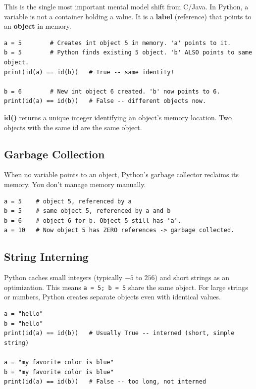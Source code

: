 \documentclass[12pt,a4paper]{article}
\newcommand{\code}[1]{\texttt{\small\color{pyblue}#1}}
\begin{document}
This is the single most important mental model shift from C/Java. In Python, a variable is not a container holding a value. It is a \textbf{label} (reference) that points to an \textbf{object} in memory.

\begin{lstlisting}
a = 5        # Creates int object 5 in memory. 'a' points to it.
b = 5        # Python finds existing 5 object. 'b' ALSO points to same object.
print(id(a) == id(b))   # True -- same identity!

b = 6        # New int object 6 created. 'b' now points to 6.
print(id(a) == id(b))   # False -- different objects now.
\end{lstlisting}

\begin{notebox}
\textbf{id()} returns a unique integer identifying an object's memory location. Two objects with the same id are the same object.
\end{notebox}

\subsection{Garbage Collection}

When no variable points to an object, Python's garbage collector reclaims its memory. You don't manage memory manually.

\begin{lstlisting}
a = 5    # object 5, referenced by a
b = 5    # same object 5, referenced by a and b
b = 6    # object 6 for b. Object 5 still has 'a'.
a = 10   # Now object 5 has ZERO references -> garbage collected.
\end{lstlisting}

\subsection{String Interning}

Python caches small integers (typically \(-5\) to \(256\)) and short strings as an optimization. This means \code{a = 5; b = 5} share the same object. For large strings or numbers, Python creates separate objects even with identical values.

\begin{lstlisting}
a = "hello"
b = "hello"
print(id(a) == id(b))   # Usually True -- interned (short, simple string)

a = "my favorite color is blue"
b = "my favorite color is blue"
print(id(a) == id(b))   # False -- too long, not interned
\end{lstlisting}
\end{document}
